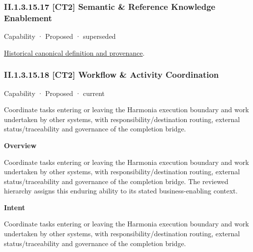 \subsubsection*{II.1.3.15.17 [CT2] Semantic \& Reference Knowledge Enablement}
\label{navigation:II.1.3.15.17}

\label{element:92a71292710c41b29775d19b98c197d6}
{\small Capability · Proposed · superseded}\par
\href{../../../../continuum/strategy/capability/92a71292710c41b29775d19b98c197d6.md}{Historical canonical definition and provenance}.\par
\subsubsection*{II.1.3.15.18 [CT2] Workflow \& Activity Coordination}
\label{navigation:II.1.3.15.18}

\label{element:c724f3d38bfa4567983a11ad22095d61}
{\small Capability · Proposed · current}\par

Coordinate tasks entering or leaving the Harmonia execution boundary and work undertaken by other systems, with responsibility/destination routing, external status/traceability and governance of the completion bridge.



\textbf{Overview}



Coordinate tasks entering or leaving the Harmonia execution boundary and work undertaken by other systems, with responsibility/destination routing, external status/traceability and governance of the completion bridge. The reviewed hierarchy assigns this enduring ability to its stated business-enabling context.



\textbf{Intent}



Coordinate tasks entering or leaving the Harmonia execution boundary and work undertaken by other systems, with responsibility/destination routing, external status/traceability and governance of the completion bridge.



